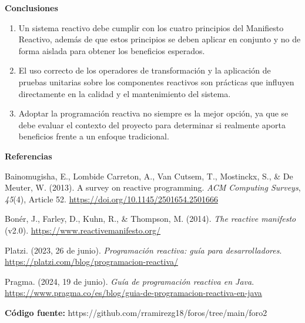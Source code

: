 \documentclass[12pt,letterpaper]{article}
\newcommand{\subtitulo}[1]{\noindent\textbf{#1}\par\vspace{2pt}}
\begin{document}
\subtitulo{Conclusiones}
\begin{enumerate}[label=\arabic*., left=0pt, itemsep=2pt]
\item Un sistema reactivo debe cumplir con los cuatro principios del Manifiesto Reactivo, además de que estos principios se deben aplicar en conjunto y no de forma aislada para obtener los beneficios esperados.
\item El uso correcto de los operadores de transformación y la aplicación de pruebas unitarias sobre los componentes reactivos son prácticas que influyen directamente en la calidad y el mantenimiento del sistema.
\item Adoptar la programación reactiva no siempre es la mejor opción, ya que se debe evaluar el contexto del proyecto para determinar si realmente aporta beneficios frente a un enfoque tradicional.
\end{enumerate}

\subtitulo{Referencias}

\hangindent=1cm \noindent Bainomugisha, E., Lombide Carreton, A., Van Cutsem, T., Mostinckx, S., \& De Meuter, W. (2013). A survey on reactive programming. \textit{ACM Computing Surveys}, \textit{45}(4), Article 52. \url{https://doi.org/10.1145/2501654.2501666}

\vspace{4pt}
\hangindent=1cm \noindent Bonér, J., Farley, D., Kuhn, R., \& Thompson, M. (2014). \textit{The reactive manifesto} (v2.0). \url{https://www.reactivemanifesto.org/}

\vspace{4pt}
\hangindent=1cm \noindent Platzi. (2023, 26 de junio). \textit{Programación reactiva: guía para desarrolladores}. \url{https://platzi.com/blog/programacion-reactiva/}

\vspace{4pt}
\hangindent=1cm \noindent Pragma. (2024, 19 de junio). \textit{Guía de programación reactiva en Java}. \url{https://www.pragma.co/es/blog/guia-de-programacion-reactiva-en-java}

\vspace{14pt}
\noindent\small \textbf{Código fuente:} https://github.com/rramirezg18/foros/tree/main/foro2
\end{document}
